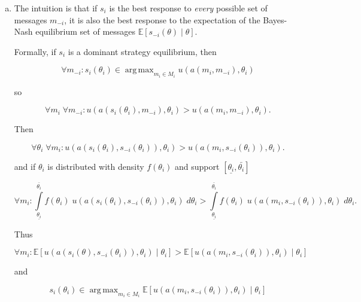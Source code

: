 \documentclass{article}
\DeclareMathOperator*{\argmax}{arg\,max}
\begin{document}
\begin{enumerate}[(a)]

	\item

	The intuition is that if $s_i$ is the best response to \textit{every} possible set of messages $m_{-i}$, it is also the best response to the expectation of the Bayes-Nash equilibrium set of messages $\mathbb{E} [s_{-i}(\theta) \; | \; \theta]$.

	Formally, if $s_i$ is a dominant strategy equilibrium, then

	\begin{equation*}
	\forall m_{-i}: s_i(\theta_i) \in \argmax_{m_i \in M_i} u(a(m_i, m_{-i}), \theta_i) 
	\end{equation*}

	so

	\begin{equation*}
	\forall m_{i} \; \forall m_{-i}: u(a(s_i(\theta_i), m_{-i}), \theta_i) > u(a(m_i, m_{-i}), \theta_i).
	\end{equation*}

	Then

	\begin{equation*}
	\forall \theta_i \; \forall m_{i} : u(a(s_i(\theta_i), s_{-i}(\theta_i)), \theta_i) > u(a(m_i, s_{-i}(\theta_i)), \theta_i).
	\end{equation*}

	and if $\theta_i$ is distributed with density $f(\theta_i)$ and support $[\underline{\theta_i}, \bar{\theta_i}]$

	\begin{equation*}
	\forall m_{i}: \int \limits_{\underline{\theta_i}}^{\bar{\theta_i}} f(\theta_i) \; u(a(s_i(\theta_i), s_{-i}(\theta_i)), \theta_i) \; d\theta_i > \int \limits_{\underline{\theta_i}}^{\bar{\theta_i}} f(\theta_i) \; u(a(m_i, s_{-i}(\theta_i)), \theta_i) \; d\theta_i.
	\end{equation*}

	Thus

	\begin{equation*}
	\forall m_{i} : \mathbb{E} [u(a(s_i(\theta), s_{-i}(\theta_i)), \theta_i) \; | \; \theta_i ] > \mathbb{E} [u(a(m_i, s_{-i}(\theta_i)), \theta_i) \; | \; \theta_i ]
	\end{equation*}

	and

	\begin{equation*}
	s_i(\theta_i) \in \argmax_{m_i \in M_i} \mathbb{E} [u(a(m_i, s_{-i}(\theta_i)), \theta_i) \; | \; \theta_i ]
	\end{equation*}


\end{enumerate}
\end{document}
